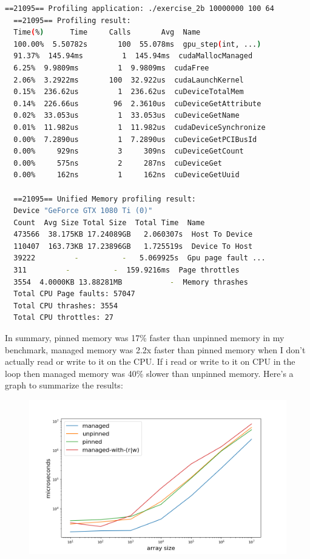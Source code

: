 \documentclass{article}
\begin{document}
\begin{mdframed}[backgroundcolor=codeColor,leftmargin=0.0cm,hidealllines=true,%
  innerleftmargin=0.1cm,innerrightmargin=0.1cm,innertopmargin=0.5cm,innerbottommargin=0.10cm,
  roundcorner=15pt]
  \begin{lstlisting}[language=bash]
  ==21095== Profiling application: ./exercise_2b 10000000 100 64
  ==21095== Profiling result:
  Time(%)      Time     Calls       Avg  Name
  100.00%  5.50782s       100  55.078ms  gpu_step(int, ...)
  91.37%  145.94ms         1  145.94ms  cudaMallocManaged
  6.25%  9.9809ms         1  9.9809ms  cudaFree
  2.06%  3.2922ms       100  32.922us  cudaLaunchKernel
  0.15%  236.62us         1  236.62us  cuDeviceTotalMem
  0.14%  226.66us        96  2.3610us  cuDeviceGetAttribute
  0.02%  33.053us         1  33.053us  cuDeviceGetName
  0.01%  11.982us         1  11.982us  cudaDeviceSynchronize
  0.00%  7.2890us         1  7.2890us  cuDeviceGetPCIBusId
  0.00%     929ns         3     309ns  cuDeviceGetCount
  0.00%     575ns         2     287ns  cuDeviceGet
  0.00%     162ns         1     162ns  cuDeviceGetUuid

  ==21095== Unified Memory profiling result:
  Device "GeForce GTX 1080 Ti (0)"
  Count  Avg Size Total Size  Total Time  Name
  473566  38.175KB 17.24089GB   2.060307s  Host To Device
  110407  163.73KB 17.23896GB   1.725519s  Device To Host
  39222         -          -   5.069925s  Gpu page fault ...
  311         -          -  159.9216ms  Page throttles
  3554  4.0000KB 13.88281MB           -  Memory thrashes
  Total CPU Page faults: 57047
  Total CPU thrashes: 3554
  Total CPU throttles: 27

  \end{lstlisting}
\end{mdframed}

In summary, pinned memory was 17\% faster than unpinned memory in my benchmark, managed memory was 2.2x faster than pinned memory when I don't actually read or write to it on the CPU. If i read or write to it on CPU in the loop then managed
memory was 40\% slower than unpinned memory. Here's a graph to summarize the results:


\begin{figure}[H]
  \centering
  \includegraphics[width=0.98\linewidth]{ex_2/simulation-time.png}
  \label{fig:}
\end{figure}
\end{document}
